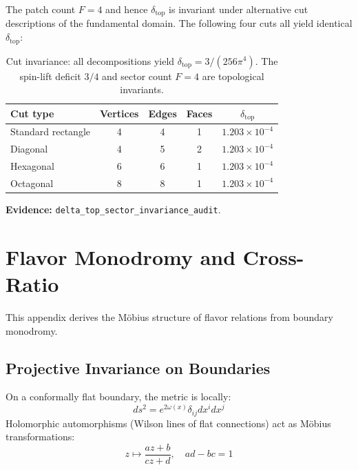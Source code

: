 The patch count $F=4$ and hence $\delta_{\mathrm{top}}$ is invariant under
alternative cut descriptions of the fundamental domain.
The following four cuts all yield identical $\delta_{\mathrm{top}}$:

\begin{table}[H]
\centering\small
\begin{tabular}{@{}lcccc@{}}
\toprule
Cut type & Vertices & Edges & Faces & $\delta_{\mathrm{top}}$\\
\midrule
Standard rectangle & 4 & 4 & 1 & $1.203\times10^{-4}$\\
Diagonal           & 4 & 5 & 2 & $1.203\times10^{-4}$\\
Hexagonal          & 6 & 6 & 1 & $1.203\times10^{-4}$\\
Octagonal          & 8 & 8 & 1 & $1.203\times10^{-4}$\\
\bottomrule
\end{tabular}
\caption{Cut invariance: all decompositions yield $\delta_{\mathrm{top}} = 3/(256\pi^4)$.
  The spin-lift deficit $3/4$ and sector count $F=4$ are topological invariants.}
\label{tab:cut-invariance}
\end{table}

\textbf{Evidence:} \texttt{delta\_top\_sector\_invariance\_audit}.

\section{Flavor Monodromy and Cross-Ratio}
\label{app:flavor}

This appendix derives the M\"obius structure of flavor relations from boundary monodromy.

\subsection{Projective Invariance on Boundaries}

On a conformally flat boundary, the metric is locally:
\begin{equation}
    ds^2 = e^{2\omega(x)} \delta_{ij} dx^i dx^j
\end{equation}
Holomorphic automorphisms (Wilson lines of flat connections) act as M\"obius 
transformations:
\begin{equation}
    z \mapsto \frac{az + b}{cz + d}, \quad ad - bc = 1
\end{equation}

